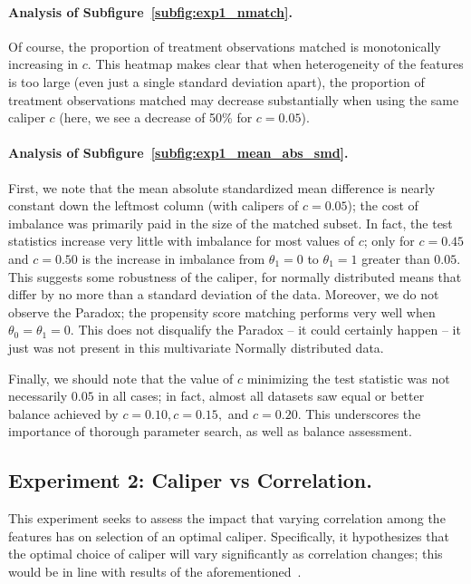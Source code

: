 \documentclass[11pt]{extarticle}
\begin{document}
\paragraph{Analysis of Subfigure~\ref{subfig:exp1_nmatch}.} Of course, the proportion of treatment observations matched is monotonically increasing in $c$. This heatmap makes clear that when heterogeneity of the features is too large (even just a single standard deviation apart), the proportion of treatment observations matched may decrease substantially when using the same caliper $c$ (here, we see a decrease of 50\% for $c = 0.05$).
\paragraph{Analysis of Subfigure~\ref{subfig:exp1_mean_abs_smd}.} First, we note that the mean absolute standardized mean difference is nearly constant down the leftmost column (with calipers of $c=0.05$); the cost of imbalance was primarily paid in the size of the matched subset. In fact, the test statistics increase very little with imbalance for most values of $c$; only for $c = 0.45$ and $c = 0.50$ is the increase in imbalance from $\theta_1 = 0$ to $\theta_1 = 1$ greater than $0.05$. This suggests some robustness of the caliper, for normally distributed means that differ by no more than a standard deviation of the data. Moreover, we do not observe the Paradox; the propensity score matching performs very well when $\theta_0 = \theta_1 = 0$. This does not disqualify the Paradox -- it could certainly happen -- it just was not present in this multivariate Normally distributed data.

Finally, we should note that the value of $c$ minimizing the test statistic was not necessarily $0.05$ in all cases; in fact, almost all datasets saw equal or better balance achieved by $c = 0.10, c = 0.15,$ and $c = 0.20$. This underscores the importance of thorough parameter search, as well as balance assessment.

\subsection{Experiment 2: Caliper vs Correlation.}
This experiment seeks to assess the impact that varying correlation among the features has on selection of an optimal caliper. Specifically, it hypothesizes that the optimal choice of caliper will vary significantly as correlation changes; this would be in line with results of the aforementioned~\textcite{austin_optimal_2011}.
\end{document}
